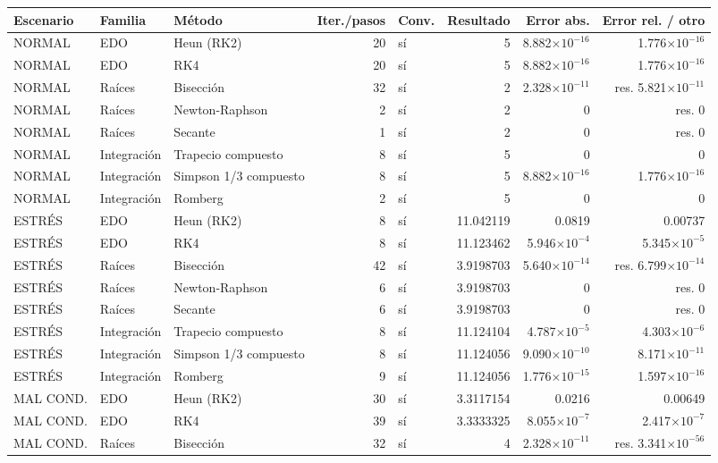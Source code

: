 {\footnotesize
\begin{longtable}{lllrlrrr}
\toprule
\textbf{Escenario} & \textbf{Familia} & \textbf{Método} & \textbf{Iter./pasos} & \textbf{Conv.} & \textbf{Resultado} & \textbf{Error abs.} & \textbf{Error rel. / otro} \\
\midrule
\endhead
NORMAL & EDO & Heun (RK2) & 20 & sí & 5 & 8.882$\times10^{-16}$ & 1.776$\times10^{-16}$ \\
NORMAL & EDO & RK4 & 20 & sí & 5 & 8.882$\times10^{-16}$ & 1.776$\times10^{-16}$ \\
NORMAL & Raíces & Bisección & 32 & sí & 2 & 2.328$\times10^{-11}$ & res. 5.821$\times10^{-11}$ \\
NORMAL & Raíces & Newton-Raphson & 2 & sí & 2 & 0 & res. 0 \\
NORMAL & Raíces & Secante & 1 & sí & 2 & 0 & res. 0 \\
NORMAL & Integración & Trapecio compuesto & 8 & sí & 5 & 0 & 0 \\
NORMAL & Integración & Simpson 1/3 compuesto & 8 & sí & 5 & 8.882$\times10^{-16}$ & 1.776$\times10^{-16}$ \\
NORMAL & Integración & Romberg & 2 & sí & 5 & 0 & 0 \\
ESTRÉS & EDO & Heun (RK2) & 8 & sí & 11.042119 & 0.0819 & 0.00737 \\
ESTRÉS & EDO & RK4 & 8 & sí & 11.123462 & 5.946$\times10^{-4}$ & 5.345$\times10^{-5}$ \\
ESTRÉS & Raíces & Bisección & 42 & sí & 3.9198703 & 5.640$\times10^{-14}$ & res. 6.799$\times10^{-14}$ \\
ESTRÉS & Raíces & Newton-Raphson & 6 & sí & 3.9198703 & 0 & res. 0 \\
ESTRÉS & Raíces & Secante & 6 & sí & 3.9198703 & 0 & res. 0 \\
ESTRÉS & Integración & Trapecio compuesto & 8 & sí & 11.124104 & 4.787$\times10^{-5}$ & 4.303$\times10^{-6}$ \\
ESTRÉS & Integración & Simpson 1/3 compuesto & 8 & sí & 11.124056 & 9.090$\times10^{-10}$ & 8.171$\times10^{-11}$ \\
ESTRÉS & Integración & Romberg & 9 & sí & 11.124056 & 1.776$\times10^{-15}$ & 1.597$\times10^{-16}$ \\
MAL COND. & EDO & Heun (RK2) & 30 & sí & 3.3117154 & 0.0216 & 0.00649 \\
MAL COND. & EDO & RK4 & 39 & sí & 3.3333325 & 8.055$\times10^{-7}$ & 2.417$\times10^{-7}$ \\
MAL COND. & Raíces & Bisección & 32 & sí & 4 & 2.328$\times10^{-11}$ & res. 3.341$\times10^{-56}$ \\

\end{longtable}}
